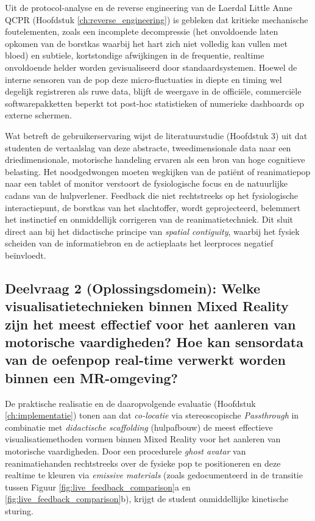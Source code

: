 Uit de protocol-analyse en de reverse engineering van de Laerdal Little Anne QCPR (Hoofdstuk \ref{ch:reverse_engineering}) is gebleken dat 
kritieke mechanische foutelementen, zoals een incomplete decompressie (het onvoldoende laten opkomen van de borstkas waarbij het hart zich 
niet volledig kan vullen met bloed) en subtiele, kortstondige afwijkingen in de frequentie, realtime onvoldoende helder worden gevisualiseerd 
door standaardsystemen. Hoewel de interne sensoren van de pop deze micro-fluctuaties in diepte en timing wel degelijk registreren als ruwe data, 
blijft de weergave in de officiële, commerciële softwarepakketten beperkt tot post-hoc statistieken of numerieke dashboards op externe schermen.

Wat betreft de gebruikerservaring wijst de literatuurstudie (Hoofdstuk 3) uit dat studenten de vertaalslag van deze abstracte, tweedimensionale 
data naar een driedimensionale, motorische handeling ervaren als een bron van hoge cognitieve belasting. Het noodgedwongen moeten wegkijken van 
de patiënt of reanimatiepop naar een tablet of monitor verstoort de fysiologische focus en de natuurlijke cadans van de hulpverlener. 
Feedback die niet rechtstreeks op het fysiologische interactiepunt, de borstkas van het slachtoffer, wordt geprojecteerd, belemmert het 
instinctief en onmiddellijk corrigeren van de reanimatietechniek. Dit sluit direct aan bij het didactische principe van 
\textit{spatial contiguity}, waarbij het fysiek scheiden van de informatiebron en de actieplaats het leerproces negatief beïnvloedt.

\subsection*{Deelvraag 2 (Oplossingsdomein): Welke visualisatietechnieken binnen Mixed Reality zijn het meest effectief voor het aanleren van 
motorische vaardigheden? Hoe kan sensordata van de oefenpop real-time verwerkt worden binnen een MR-omgeving?}

De praktische realisatie en de daaropvolgende evaluatie (Hoofdstuk \ref{ch:implementatie}) tonen aan dat \textit{co-locatie} 
via stereoscopische \textit{Passthrough} in combinatie met \textit{didactische scaffolding} (hulpafbouw) de meest effectieve 
visualisatiemethoden vormen binnen Mixed Reality voor het aanleren van motorische vaardigheden. Door een procedurele \textit{ghost avatar} 
van reanimatiehanden rechtstreeks over de fysieke pop te positioneren en deze realtime te kleuren via \textit{emissive materials} 
(zoals gedocumenteerd in de transitie tussen Figuur \ref{fig:live_feedback_comparison}a en \ref{fig:live_feedback_comparison}b), 
krijgt de student onmiddellijke kinetische sturing.


